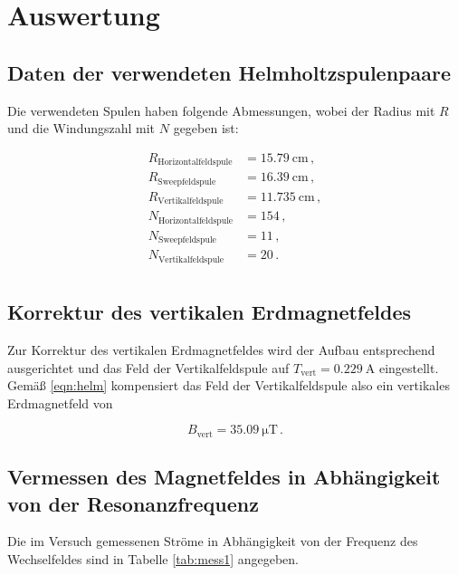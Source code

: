\section{Auswertung}
\label{sec:Auswertung}

\subsection{Daten der verwendeten Helmholtzspulenpaare}

Die verwendeten Spulen haben folgende Abmessungen, wobei der Radius mit $R$ und die Windungszahl mit $N$ gegeben ist:

\begin{align*}
  R_\text{Horizontalfeldspule} &= \SI{15.79}{\centi\meter}\,,\\
  R_\text{Sweepfeldspule} &= \SI{16.39}{\centi\meter}\,,\\
  R_\text{Vertikalfeldspule} &= \SI{11.735}{\centi\meter}\,,\\
  N_\text{Horizontalfeldspule} &= \num{154}\,,\\
  N_\text{Sweepfeldspule} &= \num{11}\,,\\
  N_\text{Vertikalfeldspule} &= \num{20}\,.\\  
\end{align*}

\subsection{Korrektur des vertikalen Erdmagnetfeldes}

Zur Korrektur des vertikalen Erdmagnetfeldes wird der Aufbau entsprechend \label{sec:Durchführung} ausgerichtet und das Feld der Vertikalfeldspule auf $T_\text{vert} = \SI{0.229}{\ampere}$
eingestellt. Gemäß \eqref{eqn:helm} kompensiert das Feld der Vertikalfeldspule also ein vertikales Erdmagnetfeld von 

\begin{equation*}
  B_\text{vert} = \SI{35.09}{\micro\tesla}\,.
\end{equation*}

\subsection{Vermessen des Magnetfeldes in Abhängigkeit von der Resonanzfrequenz}

Die im Versuch gemessenen Ströme in Abhängigkeit von der Frequenz des Wechselfeldes sind in Tabelle \ref{tab:mess1} angegeben.

